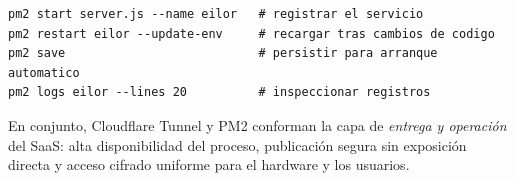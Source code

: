 \begin{lstlisting}[style=bash,caption={Operación del servicio con PM2},label={lst:pm2},basicstyle=\ttfamily\footnotesize]
pm2 start server.js --name eilor   # registrar el servicio
pm2 restart eilor --update-env     # recargar tras cambios de codigo
pm2 save                           # persistir para arranque automatico
pm2 logs eilor --lines 20          # inspeccionar registros
\end{lstlisting}

En conjunto, Cloudflare Tunnel y PM2 conforman la capa de \emph{entrega y operación} del SaaS: alta disponibilidad del proceso, publicación segura sin exposición directa y acceso cifrado uniforme para el hardware y los usuarios.
